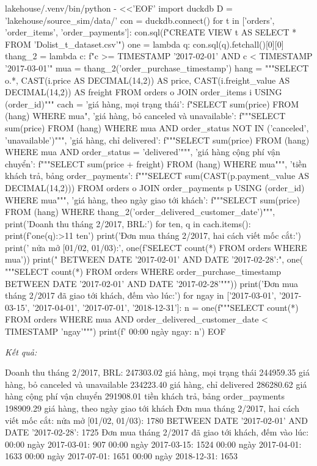 \begin{codeblock}
lakehouse/.venv/bin/python - <<'EOF'
import duckdb
D = 'lakehouse/source_sim/data/'
con = duckdb.connect()
for t in ['orders', 'order_items', 'order_payments']:
    con.sql(f"CREATE VIEW {t} AS SELECT * FROM '{D}olist_{t}_dataset.csv'")
one = lambda q: con.sql(q).fetchall()[0][0]
thang_2 = lambda c: f"{c} >= TIMESTAMP '2017-02-01' AND {c} < TIMESTAMP '2017-03-01'"
mua = thang_2('order_purchase_timestamp')
hang = """SELECT o.*, CAST(i.price AS DECIMAL(14,2)) AS price,
                 CAST(i.freight_value AS DECIMAL(14,2)) AS freight
          FROM orders o JOIN order_items i USING (order_id)"""
cach = {
  'giá hàng, mọi trạng thái': f"SELECT sum(price) FROM ({hang}) WHERE {mua}",
  'giá hàng, bỏ canceled và unavailable': f"""SELECT sum(price) FROM ({hang})
      WHERE {mua} AND order_status NOT IN ('canceled', 'unavailable')""",
  'giá hàng, chỉ delivered': f"""SELECT sum(price) FROM ({hang})
      WHERE {mua} AND order_status = 'delivered'""",
  'giá hàng cộng phí vận chuyển': f"""SELECT sum(price + freight) FROM ({hang})
      WHERE {mua}""",
  'tiền khách trả, bảng order_payments': f"""SELECT
      sum(CAST(p.payment_value AS DECIMAL(14,2)))
      FROM orders o JOIN order_payments p USING (order_id) WHERE {mua}""",
  'giá hàng, theo ngày giao tới khách': f"""SELECT sum(price) FROM ({hang})
      WHERE {thang_2('order_delivered_customer_date')}""",
}
print('Doanh thu tháng 2/2017, BRL:')
for ten, q in cach.items():
    print(f'{one(q):>11}  {ten}')
print('Đơn mua tháng 2/2017, hai cách viết mốc cắt:')
print('  nửa mở [01/02, 01/03):', one(f'SELECT count(*) FROM orders WHERE {mua}'))
print("  BETWEEN DATE '2017-02-01' AND DATE '2017-02-28':", one(
    """SELECT count(*) FROM orders WHERE order_purchase_timestamp
       BETWEEN DATE '2017-02-01' AND DATE '2017-02-28'"""))
print('Đơn mua tháng 2/2017 đã giao tới khách, đếm vào lúc:')
for ngay in ['2017-03-01', '2017-03-15', '2017-04-01', '2017-07-01', '2018-12-31']:
    n = one(f"""SELECT count(*) FROM orders WHERE {mua}
                AND order_delivered_customer_date < TIMESTAMP '{ngay}'""")
    print(f'  00:00 ngày {ngay}: {n}')
EOF
\end{codeblock}
\textit{Kết quả:}
\begin{codeblock}
Doanh thu tháng 2/2017, BRL:
  247303.02  giá hàng, mọi trạng thái
  244959.35  giá hàng, bỏ canceled và unavailable
  234223.40  giá hàng, chỉ delivered
  286280.62  giá hàng cộng phí vận chuyển
  291908.01  tiền khách trả, bảng order_payments
  198909.29  giá hàng, theo ngày giao tới khách
Đơn mua tháng 2/2017, hai cách viết mốc cắt:
  nửa mở [01/02, 01/03): 1780
  BETWEEN DATE '2017-02-01' AND DATE '2017-02-28': 1725
Đơn mua tháng 2/2017 đã giao tới khách, đếm vào lúc:
  00:00 ngày 2017-03-01: 907
  00:00 ngày 2017-03-15: 1524
  00:00 ngày 2017-04-01: 1633
  00:00 ngày 2017-07-01: 1651
  00:00 ngày 2018-12-31: 1653
\end{codeblock}

